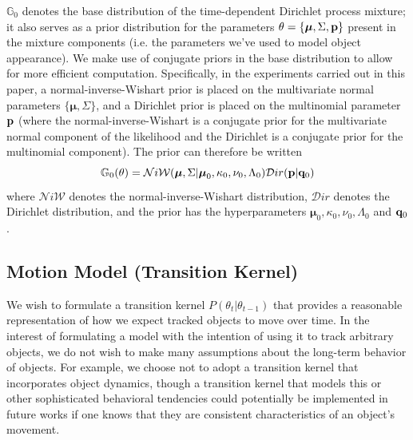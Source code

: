 \documentclass[twocolumn, final]{svjour3}
\begin{document}
$\mathbb{G}_{0}$ denotes the base distribution of the time-dependent Dirichlet process mixture; it also serves as a prior distribution for the parameters $\theta = \{ \boldsymbol{\mu}, \Sigma, \bold{p} \}$ present in the mixture components (i.e. the parameters we've used to model object appearance). We make use of conjugate priors in the base distribution to allow for more efficient computation. Specifically, in the experiments carried out in this paper, a normal-inverse-Wishart prior is placed on the multivariate normal parameters $\{ \boldsymbol{\mu}, \Sigma \}$, and a Dirichlet prior is placed on the multinomial parameter $\bold{p}$ (where the normal-inverse-Wishart is a conjugate prior for the multivariate normal component of the likelihood and the Dirichlet is a conjugate prior for the multinomial component). The prior can therefore be written
\begin{equation}
\label{basedistro}
\mathbb{G}_{0}(\theta) = \mathcal{N}i\mathcal{W}(\boldsymbol{\mu}, \Sigma | \boldsymbol{\mu}_{0}, \kappa_{0}, \nu_{0}, \Lambda_{0})  \mathcal{D}ir( \bold{p} | \bold{q}_{0})
\end{equation}
where $\mathcal{N}i\mathcal{W}$ denotes the normal-inverse-Wishart distribution, $\mathcal{D}ir$ denotes the Dirichlet distribution, and the prior has the hyperparameters $\boldsymbol{\mu}_{0}, \kappa_{0}, \nu_{0}, \Lambda_{0}$ and $\bold{q}_{0}$.


\subsection{Motion Model (Transition Kernel)}
\label{sec:motionmodel}

We wish to formulate a transition kernel $P(\theta_{t} | \theta_{t-1})$ that provides a reasonable representation of how we expect tracked objects to move over time. In the interest of formulating a model with the intention of using it to track arbitrary objects, we do not wish to make many assumptions about the long-term behavior of objects. For example, we choose not to adopt a transition kernel that incorporates object dynamics, though a transition kernel that models this or other sophisticated behavioral tendencies could potentially be implemented in future works if one knows that they are consistent characteristics of an object's movement.
\end{document}

